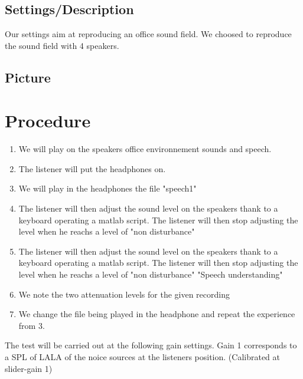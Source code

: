 \documentclass[12pt,a4paper]{article}
\begin{document}
\subsection{Settings/Description}

Our settings aim at reproducing an office sound field. We choosed to reproduce the sound field with 4 speakers.

\subsection{Picture}
\vspace{1cm}
\section{Procedure}

\begin{enumerate}


\item We will play on the speakers office environnement sounds and speech. 
\item The listener will put the headphones on.
\item We will play in the headphones the file "speech1"
\item The listener will then adjust the sound level on the speakers thank to a keyboard operating a matlab script. The listener will then stop adjusting the level when he reachs a level of "non disturbance"
\item The listener will then adjust the sound level on the speakers thank to a keyboard operating a matlab script. The listener will then stop adjusting the level when he reachs a level of "non disturbance" "Speech understanding"
\item We note the two attenuation levels for the given recording
\item We change the file being played in the headphone and repeat the experience from 3.
\end{enumerate}
\noindent
The test will be carried out at the following gain settings. Gain 1 corresponds to a SPL of LALA of the noice sources at the listeners position. (Calibrated at slider-gain 1) \\\\
\end{document}
